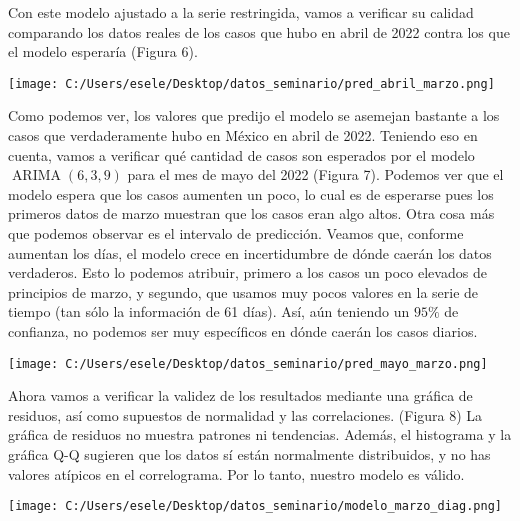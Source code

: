 \documentclass[11pt,letterpaper]{article}
\newcommand{\ARIMA}{\ensuremath{\operatorname{ARIMA}}}
\theoremstyle{definition}
\theoremstyle{theorem}
\theoremstyle{remark}
\begin{document}
	\par Con este modelo ajustado a la serie restringida, vamos a verificar su calidad comparando los datos reales de los casos que hubo en abril de 2022 contra los que el modelo esperaría (Figura 6).
	\begin{center}
		\texttt{[image: C:/Users/esele/Desktop/datos\_seminario/pred\_abril\_marzo.png]}
	\end{center}
	\par Como podemos ver, los valores que predijo el modelo se asemejan bastante a los casos que verdaderamente hubo en México en abril de 2022. Teniendo eso en cuenta, vamos a verificar qué cantidad de casos son esperados por el modelo \(\ARIMA(6,3,9)\) para el mes de mayo del 2022 (Figura 7). Podemos ver que el modelo espera que los casos aumenten un poco, lo cual es de esperarse pues los primeros datos de marzo muestran que los casos eran algo altos. Otra cosa más que podemos observar es el intervalo de predicción. Veamos que, conforme aumentan los días, el modelo crece en incertidumbre de dónde caerán los datos verdaderos. Esto lo podemos atribuir, primero a los casos un poco elevados de principios de marzo, y segundo, que usamos muy pocos valores en la serie de tiempo (tan sólo la información de 61 días). Así, aún teniendo un \(95\%\) de confianza, no podemos ser muy específicos en dónde caerán los casos diarios.\clearpage
	\begin{center}
 		\texttt{[image: C:/Users/esele/Desktop/datos\_seminario/pred\_mayo\_marzo.png]}\vspace*{-1em}
 	\end{center}
	\par Ahora vamos a verificar la validez de los resultados mediante una gráfica de residuos, así como supuestos de normalidad y las correlaciones. (Figura 8) La gráfica de residuos no muestra patrones ni tendencias. Además, el histograma y la gráfica Q-Q sugieren que los datos sí están normalmente distribuidos, y no has valores atípicos en el correlograma. Por lo tanto, nuestro modelo es válido.
	\begin{center}
		\hspace*{-1em}\texttt{[image: C:/Users/esele/Desktop/datos\_seminario/modelo\_marzo\_diag.png]}
	\end{center}
\end{document}
